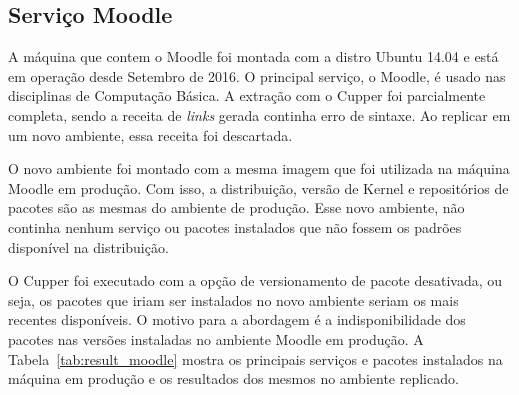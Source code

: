 \subsection{Serviço Moodle}

A máquina que contem o Moodle foi montada com a distro Ubuntu 14.04 e
está em operação desde Setembro de 2016. O principal serviço, o Moodle,
é usado nas disciplinas de Computação Básica.
A extração com o Cupper foi parcialmente completa, sendo a receita de \textit{links}
gerada continha erro de sintaxe. Ao replicar em um novo ambiente, essa receita
foi descartada.

O novo ambiente foi montado com a mesma imagem que foi utilizada na máquina
Moodle em produção. Com isso, a distribuição, versão de Kernel e repositórios
de pacotes são as mesmas do ambiente de produção. Esse novo ambiente, não
continha nenhum serviço ou pacotes instalados que não fossem os padrões
disponível na distribuição.

O Cupper foi executado com a opção de versionamento de pacote desativada,
ou seja, os pacotes que iriam ser instalados no novo ambiente seriam os
mais recentes disponíveis. O motivo para a abordagem é a indisponibilidade
dos pacotes nas versões instaladas no ambiente Moodle em produção.
A Tabela~\ref{tab:result_moodle} mostra os principais serviços e pacotes instalados
na máquina em produção e os resultados dos mesmos no ambiente replicado.

